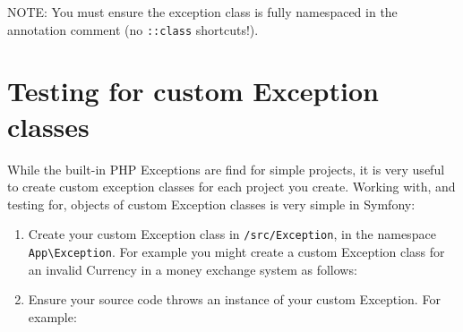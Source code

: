 \documentclass[a4paperpaper,openright]{book}
\newenvironment{Shaded}{}{}
\newcommand{\CommentTok}[1]{\textcolor[rgb]{0.38,0.63,0.69}{\textit{#1}}}
\newcommand{\FunctionTok}[1]{\textcolor[rgb]{0.02,0.16,0.49}{#1}}
\newcommand{\KeywordTok}[1]{\textcolor[rgb]{0.00,0.44,0.13}{\textbf{#1}}}
\newcommand{\NormalTok}[1]{#1}
\newcommand{\OtherTok}[1]{\textcolor[rgb]{0.00,0.44,0.13}{#1}}
\newcommand{\StringTok}[1]{\textcolor[rgb]{0.25,0.44,0.63}{#1}}
\begin{document}
NOTE: You must ensure the exception class is fully namespaced in the
annotation comment (no \texttt{::class} shortcuts!).

\hypertarget{testing-for-custom-exception-classes}{%
\section{Testing for custom Exception
classes}\label{testing-for-custom-exception-classes}}

While the built-in PHP Exceptions are find for simple projects, it is
very useful to create custom exception classes for each project you
create. Working with, and testing for, objects of custom Exception
classes is very simple in Symfony:

\begin{enumerate}
\def\labelenumi{\arabic{enumi}.}
\item
  Create your custom Exception class in \texttt{/src/Exception}, in the
  namespace \texttt{App\textbackslash{}Exception}. For example you might
  create a custom Exception class for an invalid Currency in a money
  exchange system as follows:

\begin{Shaded}
\end{Shaded}
\item
  Ensure your source code throws an instance of your custom Exception.
  For example:


\end{enumerate}
\end{document}
